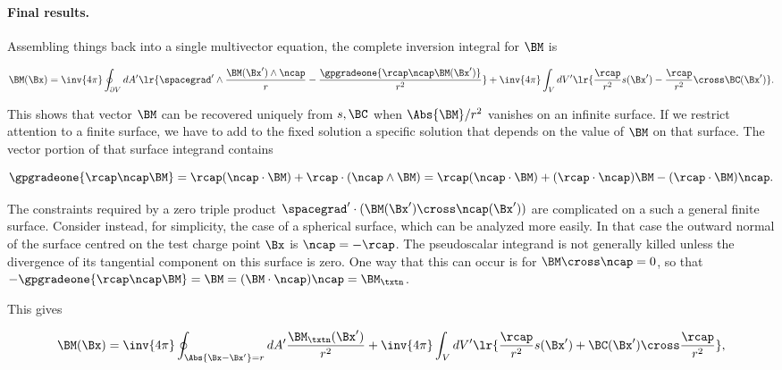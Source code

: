\paragraph{Final results.}

Assembling things back into a single multivector equation, the complete inversion integral for \( \BM \) is

\begin{dmath}\label{eqn:emtProblemSet1Problem5AppendixGA:600}
\BM(\Bx)
=
\inv{4 \pi} \oint_{\partial V} dA' 
\lr{
\spacegrad' \wedge 
\frac{\BM(\Bx') \wedge \ncap}{r}
-\frac{\gpgradeone{ \rcap \ncap \BM(\Bx') }}{r^2}
}
+
\inv{4 \pi} \int_V dV' \lr{
\frac{\rcap}{r^2} s(\Bx') - 
\frac{\rcap}{r^2} \cross \BC(\Bx') }.
\end{dmath}

This shows that vector \( \BM \) can be recovered uniquely from \( s, \BC \) when \( \Abs{\BM}/r^2 \) vanishes on an infinite surface.  
If we restrict attention to a finite surface, we have to add to the fixed solution a specific solution that depends on the value of \( \BM \) on that surface.  The vector portion of that surface integrand contains

\begin{dmath}\label{eqn:emtProblemSet1Problem5AppendixGA:640}
\gpgradeone{ \rcap \ncap \BM }
=
\rcap (\ncap \cdot \BM )
+
\rcap \cdot (\ncap \wedge \BM )
=
\rcap (\ncap \cdot \BM )
+
(\rcap \cdot \ncap) \BM 
-
(\rcap \cdot \BM ) \ncap.
\end{dmath}

The constraints required by a zero triple product \( \spacegrad' \cdot (\BM(\Bx') \cross \ncap(\Bx')) \) are complicated on a such a general finite surface.  
Consider instead, for simplicity, the case of a spherical surface, which can be analyzed more easily.  
In that case the outward normal of the surface centred on the test charge point \( \Bx \) is \( \ncap = -\rcap \).  The pseudoscalar integrand is not generally killed unless the divergence of its tangential component on this surface is zero.  One way that this can occur is for \( \BM \cross \ncap = 0 \), so that \( -\gpgradeone{ \rcap \ncap \BM } = \BM = (\BM \cdot \ncap) \ncap = \BM_\txtn \).  

This gives

\begin{dmath}\label{eqn:emtProblemSet1Problem5AppendixGA:620}
\BM(\Bx)
=
\inv{4 \pi} \oint_{\Abs{\Bx - \Bx'} = r} dA' \frac{\BM_\txtn(\Bx')}{r^2}
+
\inv{4 \pi} \int_V dV' \lr{
\frac{\rcap}{r^2} s(\Bx') + 
\BC(\Bx') \cross \frac{\rcap}{r^2} },
\end{dmath}

